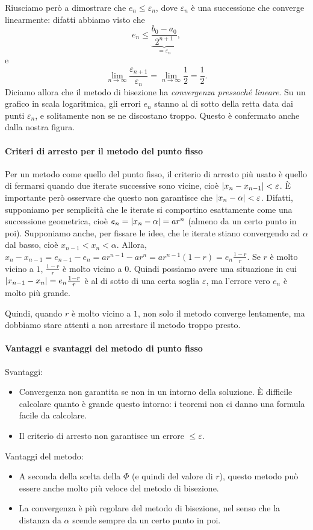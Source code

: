 \documentclass[a4paper]{report}
\DeclarePairedDelimiter{\abs}{\lvert}{\rvert}
\theoremstyle{definiton}
\theoremstyle{remark}
\begin{document}
Riusciamo però a dimostrare che $e_n \leq \varepsilon_n$, dove $\varepsilon_n$ è una successione che converge linearmente: difatti abbiamo visto che
\[
e_n \leq \underbrace{\frac{b_0 - a_0}{2^{n+1}}}_{=\varepsilon_n},
\]
e
\[
\lim_{n\to\infty} \frac{\varepsilon_{n+1}}{\varepsilon_n} = \lim_{n\to\infty} \frac{1}{2} = \frac{1}{2}.
\]
Diciamo allora che il metodo di bisezione ha \emph{convergenza pressoché lineare}. Su un grafico in scala logaritmica, gli errori $e_n$ stanno al di sotto della retta data dai punti $\varepsilon_n$, e solitamente non se ne discostano troppo. Questo è confermato anche dalla nostra figura.

\paragraph{Criteri di arresto per il metodo del punto fisso}

Per un metodo come quello del punto fisso, il criterio di arresto più usato è quello di fermarsi quando due iterate successive sono vicine, cioè $\abs{x_{n} - x_{n-1}} < \varepsilon$. È importante però osservare che questo non garantisce che $\abs{x_n - \alpha} < \varepsilon$. Difatti, supponiamo per semplicità che le iterate si comportino esattamente come una successione geometrica, cioè $e_n = \abs{x_n-\alpha} = ar^n$ (almeno da un certo punto in poi). Supponiamo anche, per fissare le idee, che le iterate stiano convergendo ad $\alpha$ dal basso, cioè $x_{n-1} < x_{n} < \alpha$. Allora, $x_{n} - x_{n-1} = e_{n-1} - e_n = ar^{n-1} - ar^n = ar^{n-1}(1-r) = e_n \frac{1-r}{r}$. Se $r$ è molto vicino a $1$, $\frac{1-r}{r}$ è molto vicino a $0$. Quindi possiamo avere una situazione in cui $\abs{x_{n-1}-x_n} = e_n \frac{1-r}{r}$ è al di sotto di una certa soglia $\varepsilon$, ma l'errore vero $e_n$ è molto più grande.

Quindi, quando $r$ è molto vicino a $1$, non solo il metodo converge lentamente, ma dobbiamo stare attenti a non arrestare il metodo troppo presto.

\paragraph{Vantaggi e svantaggi del metodo di punto fisso}

Svantaggi:
\begin{itemize}
    \item Convergenza non garantita se non in un intorno della soluzione. È difficile calcolare quanto è grande questo intorno: i teoremi non ci danno una formula facile da calcolare.
    \item Il criterio di arresto non garantisce un errore $\leq \varepsilon$.
\end{itemize}
Vantaggi del metodo:
\begin{itemize}
    \item A seconda della scelta della $\Phi$ (e quindi del valore di $r$), questo metodo può essere anche molto più veloce del metodo di bisezione.
    \item La convergenza è più regolare del metodo di bisezione, nel senso che la distanza da $\alpha$ scende sempre da un certo punto in poi. 
\end{itemize}
\end{document}
